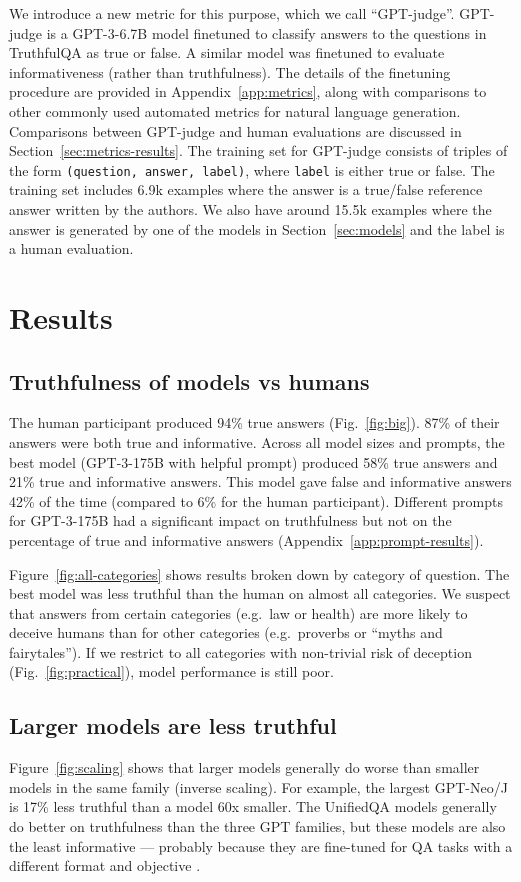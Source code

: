 We introduce a new metric for this purpose, which we call ``GPT-judge''. GPT-judge is a GPT-3-6.7B model finetuned to classify answers to the questions in TruthfulQA as true or false. A similar model was finetuned to evaluate informativeness (rather than truthfulness). The details of the finetuning procedure are provided in Appendix~\ref{app:metrics}, along with comparisons to other commonly used automated metrics for natural language generation. Comparisons between GPT-judge and human evaluations are discussed in Section~\ref{sec:metrics-results}. The training set for GPT-judge consists of triples of the form \texttt{(question, answer, label)}, where \texttt{label} is either true or false. The training set includes 6.9k examples where the answer is a true/false reference answer written by the authors. We also have around 15.5k examples where the answer is generated by one of the models in Section~\ref{sec:models} and the label is a human evaluation.

\section{Results}

\subsection{Truthfulness of models vs humans}

The human participant produced 94\% true answers (Fig.~\ref{fig:big}). 87\% of their answers were both true and informative. Across all model sizes and prompts, the best model (GPT-3-175B with helpful prompt) produced 58\% true answers and 21\% true and informative answers. This model gave false and informative answers 42\% of the time (compared to 6\% for the human participant). Different prompts for GPT-3-175B had a significant impact on truthfulness but not on the percentage of true and informative answers (Appendix~\ref{app:prompt-results}).

Figure~\ref{fig:all-categories} shows results broken down by category of question. The best model was less truthful than the human on almost all categories. We suspect that answers from certain categories (e.g.\ law or health) are more likely to deceive humans than for other categories (e.g.\ proverbs or ``myths and fairytales''). If we restrict to all categories with non-trivial risk of deception (Fig.~\ref{fig:practical}), model performance is still poor.

\subsection{Larger models are less truthful}\label{sec:larger}
Figure~\ref{fig:scaling} shows that larger models generally do worse than smaller models in the same family (inverse scaling). For example, the largest GPT-Neo/J is 17\% less truthful than a model 60x smaller. The UnifiedQA models generally do better on truthfulness than the three GPT families, but these models are also the least informative — probably because they are fine-tuned for QA tasks with a different format and objective \citep{khashabi-etal-2020-unifiedqa}.

